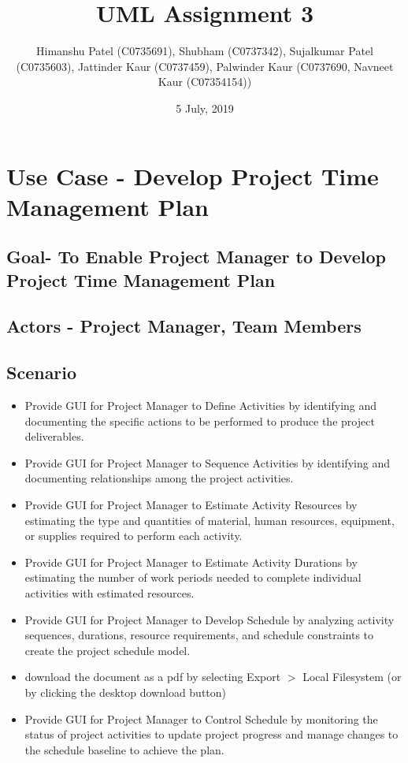 \documentclass[10pt]{article}
\title{UML Assignment 3}
\author{Himanshu Patel (C0735691), Shubham (C0737342), Sujalkumar Patel (C0735603), Jattinder Kaur (C0737459), Palwinder Kaur (C0737690, Navneet Kaur (C07354154))}
\date{5 July, 2019}
\begin{document}
\maketitle
\tableofcontents

\newpage
\section{Use Case - Develop Project Time Management Plan}
\subsection{Goal- To Enable Project Manager to Develop Project Time Management Plan}
\subsection{Actors - Project Manager, Team Members}
\subsection{Scenario}
\begin{itemize}
  \item Provide GUI for Project Manager to Define Activities by identifying and documenting the specific actions to be performed to produce the project deliverables.
  \item Provide GUI for Project Manager to Sequence Activities by identifying and documenting relationships among the project activities.
  \item Provide GUI for Project Manager to Estimate Activity Resources by estimating the type and quantities of material, human resources, equipment, or supplies required to perform each activity.
  \item Provide GUI for Project Manager to Estimate Activity Durations by estimating the number of work periods needed to complete individual activities with estimated resources.
  \item Provide GUI for Project Manager to Develop Schedule by analyzing activity sequences, durations, resource requirements, and schedule constraints to create the project schedule model.
  \item download the document as a pdf by selecting Export $>$ Local
        Filesystem (or by clicking the desktop download button)
  \item Provide GUI for Project Manager to Control Schedule by monitoring the status of project activities to update project progress and manage changes to the schedule baseline to achieve the plan.
\end{itemize}
\end{document}
